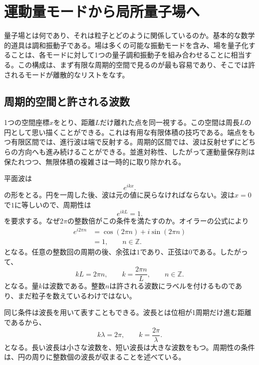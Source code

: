 \chapter{運動量モードから局所量子場へ}

量子場とは何であり、それは粒子とどのように関係しているのか。基本的な数学的道具は調和振動子である。場は多くの可能な振動モードを含み、場を量子化することは、各モードに対して1つの量子調和振動子を組み合わせることに相当する。この構成は、まず有限な周期的空間で見るのが最も容易であり、そこでは許されるモードが離散的なリストをなす。

\section{周期的空間と許される波数}

1つの空間座標\(x\)をとり、距離\(L\)だけ離れた点を同一視する。この空間は周長\(L\)の円として思い描くことができる。これは有用な有限体積の技巧である。端点をもつ有限区間では、進行波は端で反射する。周期的区間では、波は反射せずにどちらの方向へも進み続けることができる。並進対称性、したがって運動量保存則は保たれつつ、無限体積の複雑さは一時的に取り除かれる。

平面波は
\begin{equation}
e^{ikx}.
\end{equation}
の形をとる。円を一周した後、波は元の値に戻らなければならない。波は\(x=0\)で\(1\)に等しいので、周期性は
\begin{equation}
e^{ikL}=1.
\end{equation}
を要求する。なぜ\(2\pi\)の整数倍がこの条件を満たすのか。オイラーの公式により
\begin{align}
e^{i2\pi n}
&=\cos(2\pi n)+i\sin(2\pi n)\\
&=1,
\qquad n\in\mathbb Z.
\end{align}
となる。任意の整数回の周期の後、余弦は\(1\)であり、正弦は\(0\)である。したがって、
\begin{equation}
kL=2\pi n,
\qquad
k=\frac{2\pi n}{L},
\qquad n\in\mathbb Z.
\end{equation}
となる。量\(k\)は波数である。整数\(n\)は許される波数にラベルを付けるものであり、まだ粒子を数えているわけではない。

同じ条件は波長を用いて表すこともできる。波長とは位相が1周期だけ進む距離であるから、
\begin{equation}
k\lambda=2\pi,
\qquad
k=\frac{2\pi}{\lambda}.
\end{equation}
となる。長い波長は小さな波数を、短い波長は大きな波数をもつ。周期性の条件は、円の周りに整数個の波長が収まることを述べている。

